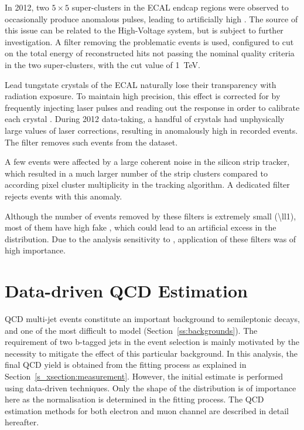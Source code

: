 \begin{description}[wide=\parindent]
	\item[Bad ECAL endcap super-cluster filter.] In 2012, two $5\times5$ super-clusters in the ECAL endcap regions were
	observed to occasionally produce anomalous pulses, leading to artificially high \MET. The source of this issue can
	be related to the High-Voltage system, but is subject to further investigation. A filter removing the problematic
	events is used, configured to cut on the total energy of reconstructed hits not passing the nominal quality criteria
	in the two super-clusters, with the cut value of \SI{1}{\TeV}.

	\item[ECAL laser correction filter.] Lead tungstate crystals of the ECAL naturally lose their transparency with
	radiation exposure. To maintain high precision, this effect is corrected for by frequently injecting laser pulses
	and reading out the response in order to calibrate each crystal \autocite{CMS_TDR1}. During 2012 data-taking, a
	handful of crystals had unphysically large values of laser corrections, resulting in anomalously high \MET in
	recorded events. The filter removes such events from the dataset.

	\item[Strip tracker noise filter.] A few events were affected by a large coherent noise in the silicon strip
	tracker, which resulted in a much larger number of the strip clusters compared to according pixel cluster
	multiplicity in the tracking algorithm. A dedicated filter rejects events with this anomaly.

\end{description}

Although the number of events removed by these filters is extremely small (\SI{\ll1}{\pc}), most of them have high fake
\MET, which could lead to an artificial excess in the \MET distribution. Due to the analysis sensitivity to \MET,
application of these filters was of high importance.

\section{Data-driven QCD Estimation}
\label{s_xsection:data_driven_QCD}
QCD multi-jet events constitute an important background to semileptonic \ttbar decays, and one of the most difficult to
model (Section~\ref{ss:backgrounds}). The requirement of two b-tagged jets in the event selection is mainly motivated by
the necessity to mitigate the effect of this particular background. In this analysis, the final QCD yield is obtained
from the fitting process as explained in Section~\ref{s_xsection:measurement}. However, the initial estimate is
performed using data-driven techniques. Only the shape of the distribution is of importance here as the normalisation is
determined in the fitting process. The QCD estimation methods for both electron and muon channel are described in detail
hereafter.

